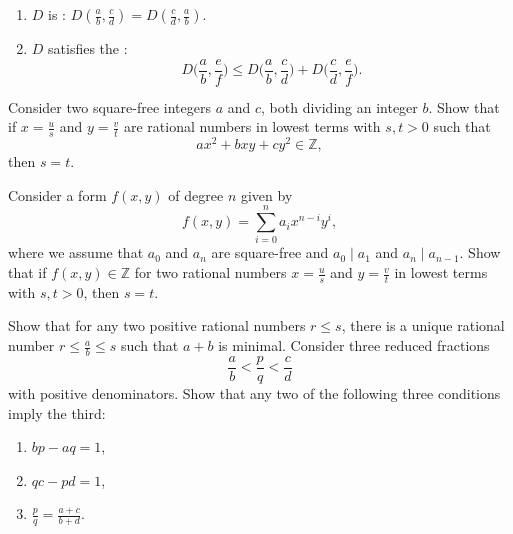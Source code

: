 \begin{routine}
\begin{enumerate}
  \item $D$ is : $D(\frac{a}{b},\frac{c}{d})=D(\frac{c}{d},\frac{a}{b})$.
  \item $D$ satisfies the :
    \begin{equation*}
      D\Big(\frac{a}{b},\frac{e}{f}\Big)\leq D\Big(\frac{a}{b},\frac{c}{d}\Big)+D\Big(\frac{c}{d},\frac{e}{f}\Big).
    \end{equation*}
  \end{enumerate}
  \exercise \label{exercise:equal-denominators-rational-point-on-form}
  \begin{subexenum}
  \item Consider two square-free integers $a$ and $c$, both dividing an integer $b$. Show that if $x=\frac{u}{s}$ and $y=\frac{v}{t}$ are rational numbers in lowest terms with $s,t>0$ such that
    \begin{equation*}
      ax^2+bxy+cy^2\in\mathbb{Z},
    \end{equation*}
    then $s=t$.
  \item Consider a form $f(x,y)$ of degree $n$ given by
    \begin{equation*}
      f(x,y)=\sum_{i=0}^n a_i x^{n-i}y^i,
    \end{equation*}
    where we assume that $a_0$ and $a_n$ are square-free and $a_0\mid a_1$ and $a_n\mid a_{n-1}$. Show that if $f(x,y)\in\mathbb{Z}$ for two rational numbers $x=\frac{u}{s}$ and $y=\frac{v}{t}$ in lowest terms with $s,t>0$, then $s=t$.
  \end{subexenum}
  \exercise Show that for any two positive rational numbers $r\leq s$, there is a unique rational number $r\leq \tfrac{a}{b} \leq s$ such that $a+b$ is minimal.
  \exercise Consider three reduced fractions
  \begin{equation*}
    \frac{a}{b}<\frac{p}{q}<\frac{c}{d}
  \end{equation*}
  with positive denominators. Show that any two of the following three conditions imply the third:
  \begin{enumerate}
  \item $bp-aq=1$,
  \item $qc-pd=1$,
  \item $\frac{p}{q}=\frac{a+c}{b+d}$.
  \end{enumerate}
\end{routine}


\endinput
